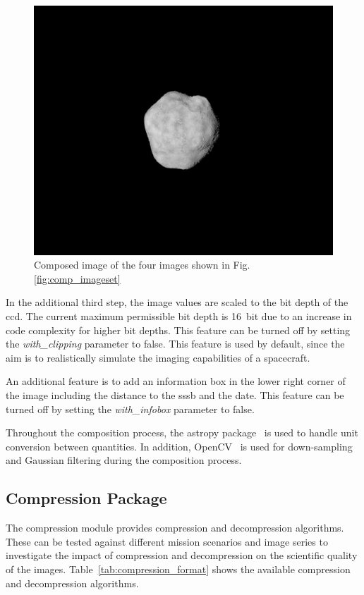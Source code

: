\begin{figure}[htb]
    \centering
    \includegraphics[width=\textwidth]{doc/thesis/0_figures/composition/Comp_2017-08-15T115854-575000.png}
    \caption{Composed image of the four images shown in Fig. \ref{fig:comp_imageset}}
    \label{fig:comp_composed}
\end{figure}

In the additional third step, the image values are scaled to the bit depth of the \gls{ccd}. The current maximum permissible bit depth is \SI{16}{bit} due to an increase in code complexity for higher bit depths. This feature can be turned off by setting the \textit{with\_clipping} parameter to false. This feature is used by default, since the aim is to realistically simulate the imaging capabilities of a spacecraft.

An additional feature is to add an information box in the lower right corner of the image including the distance to the \gls{sssb} and the date. This feature can be turned off by setting the \textit{with\_infobox} parameter to false.

Throughout the composition process, the astropy package~\cite{robitaille2013astropy, price2018astropy} is used to handle unit conversion between quantities. In addition, OpenCV~\cite{opencv_library} is used for down-sampling and Gaussian filtering during the composition process.

\subsection{Compression Package}
The compression module provides compression and decompression algorithms. These can be tested against different mission scenarios and image series to investigate the impact of compression and decompression on the scientific quality of the images. Table~\ref{tab:compression_format} shows the available compression and decompression algorithms.

